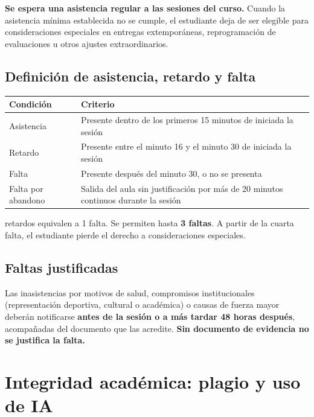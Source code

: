 \documentclass[12pt]{article}
\begin{document}
	\textbf{Se espera una asistencia regular a las sesiones del curso.} Cuando la asistencia mínima establecida no se cumple, el estudiante deja de ser elegible para consideraciones especiales en entregas extemporáneas, reprogramación de evaluaciones u otros ajustes extraordinarios.
	
	\subsection*{Definición de asistencia, retardo y falta}
	
	\begin{center}
		\begin{tabular}{|l|p{8cm}|}
			\hline
			\textbf{Condición} & \textbf{Criterio} \\
			\hline
			Asistencia & Presente dentro de los primeros 15 minutos de iniciada la sesión \\
			\hline
			Retardo & Presente entre el minuto 16 y el minuto 30 de iniciada la sesión \\
			\hline
			Falta & Presente después del minuto 30, o no se presenta \\
			\hline
			Falta por abandono & Salida del aula sin justificación por más de 20 minutos continuos durante la sesión \\
			\hline
		\end{tabular}
	\end{center}
	
	\vspace{0.5em}
	
	 retardos equivalen a 1 falta. Se permiten hasta \textbf{3 faltas}. A partir de la cuarta falta, el estudiante pierde el derecho a consideraciones especiales.
	
	\subsection*{Faltas justificadas}
	
	Las inasistencias por motivos de salud, compromisos institucionales (representación deportiva, cultural o académica) o causas de fuerza mayor deberán notificarse \textbf{antes de la sesión o a más tardar 48 horas después}, acompañadas del documento que las acredite. \textbf{Sin documento de evidencia no se justifica la falta.}
	
	\section*{Integridad académica: plagio y uso de IA}
	
\end{document}
